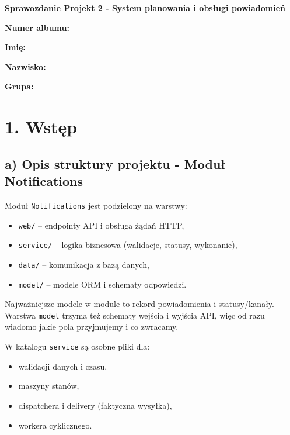 \documentclass[a4paper,12pt]{article}
\begin{document}
\begin{center}
    {\LARGE \textbf{Sprawozdanie Projekt 2 - System planowania i obsługi powiadomień}}\\[1.5em]
\end{center}

\textbf{Numer albumu: \underline{\hspace{4cm}}}

\textbf{Imię: \underline{\hspace{5cm}}}

\textbf{Nazwisko: \underline{\hspace{4.7cm}}}

\textbf{Grupa: \underline{\hspace{5.4cm}}}

\vspace{1em}

\section*{1. Wstęp}
\subsection*{a) Opis struktury projektu - Moduł Notifications}

Moduł \texttt{Notifications} jest podzielony na warstwy:
\begin{itemize}[leftmargin=1.5em]
    \item \texttt{web/} -- endpointy API i obsługa żądań HTTP,
    \item \texttt{service/} -- logika biznesowa (walidacje, statusy, wykonanie),
    \item \texttt{data/} -- komunikacja z bazą danych,
    \item \texttt{model/} -- modele ORM i schematy odpowiedzi.
\end{itemize}

Najważniejsze modele w module to rekord powiadomienia i statusy/kanały. Warstwa \texttt{model} trzyma też schematy wejścia i wyjścia API, więc od razu wiadomo jakie pola przyjmujemy i co zwracamy.

W katalogu \texttt{service} są osobne pliki dla:
\begin{itemize}[leftmargin=1.5em]
    \item walidacji danych i czasu,
    \item maszyny stanów,
    \item dispatchera i delivery (faktyczna wysyłka),
    \item workera cyklicznego.
\end{itemize}
\end{document}
